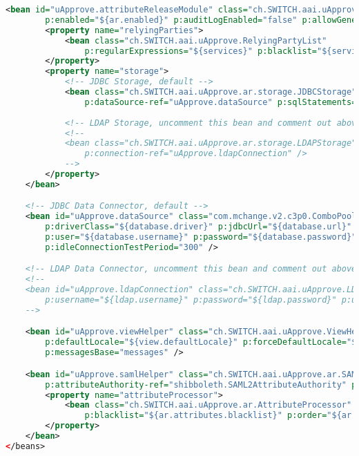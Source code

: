 \begin{lstlisting}[language=xml]
    <bean id="uApprove.attributeReleaseModule" class="ch.SWITCH.aai.uApprove.ar.AttributeReleaseModule" init-method="initialize"
        p:enabled="${ar.enabled}" p:auditLogEnabled="false" p:allowGeneralConsent="${ar.allowGeneralConsent}" p:compareAttributeValues="false">
        <property name="relyingParties">
            <bean class="ch.SWITCH.aai.uApprove.RelyingPartyList"
                p:regularExpressions="${services}" p:blacklist="${services.blacklist}" />
        </property>
        <property name="storage">
            <!-- JDBC Storage, default -->
            <bean class="ch.SWITCH.aai.uApprove.ar.storage.JDBCStorage" init-method="initialize"
                p:dataSource-ref="uApprove.dataSource" p:sqlStatements="classpath:/storage/sql-statements.properties" p:graceful="false" />
            
            <!-- LDAP Storage, uncomment this bean and comment out above JDBC bean to activate LDAP -->
            <!--
            <bean class="ch.SWITCH.aai.uApprove.ar.storage.LDAPStorage"
                p:connection-ref="uApprove.ldapConnection" />
            -->
        </property>
    </bean>

    <!-- JDBC Data Connector, default -->
    <bean id="uApprove.dataSource" class="com.mchange.v2.c3p0.ComboPooledDataSource" destroy-method="close" depends-on="shibboleth.LogbackLogging"
        p:driverClass="${database.driver}" p:jdbcUrl="${database.url}"
        p:user="${database.username}" p:password="${database.password}"
        p:idleConnectionTestPeriod="300" />

    <!-- LDAP Data Connector, uncomment this bean and comment out above JDBC bean to activate LDAP -->
    <!--
    <bean id="uApprove.ldapConnection" class="ch.SWITCH.aai.uApprove.LDAPConnectionDetails"
        p:username="${ldap.username}" p:password="${ldap.password}" p:url="${ldap.url}" p:base="${ldap.base}" p:contextFactory="com.sun.jndi.ldap.LdapCtxFactory" p:authentification="simple" />
    -->

    <bean id="uApprove.viewHelper" class="ch.SWITCH.aai.uApprove.ViewHelper" init-method="initialize"
        p:defaultLocale="${view.defaultLocale}" p:forceDefaultLocale="${view.forceDefaultLocale}"
        p:messagesBase="messages" />

    <bean id="uApprove.samlHelper" class="ch.SWITCH.aai.uApprove.ar.SAMLHelper" init-method="initialize"
        p:attributeAuthority-ref="shibboleth.SAML2AttributeAuthority" p:relyingPartyConfigurationManager-ref="shibboleth.RelyingPartyConfigurationManager">
        <property name="attributeProcessor">
            <bean class="ch.SWITCH.aai.uApprove.ar.AttributeProcessor"
                p:blacklist="${ar.attributes.blacklist}" p:order="${ar.attributes.order}" />
        </property>
    </bean>
</beans>
\end{lstlisting}

